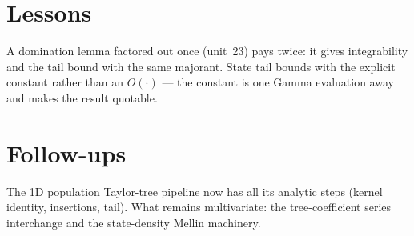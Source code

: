 \documentclass[11pt]{article}
\begin{document}
\section{Lessons}
A domination lemma factored out once (unit~23) pays twice: it gives integrability and the tail bound
with the same majorant. State tail bounds with the explicit constant rather than an
$O(\cdot)$ --- the constant is one Gamma evaluation away and makes the result quotable.

\section{Follow-ups}
The 1D population Taylor-tree pipeline now has all its analytic steps (kernel identity, insertions,
tail). What remains multivariate: the tree-coefficient series interchange and the state-density
Mellin machinery.
\end{document}
